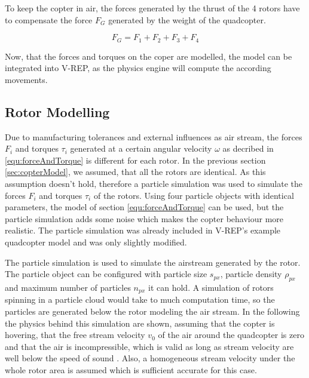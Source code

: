    To keep the copter in air, the forces generated by the thrust of the 4 rotors have to compensate the force $F_{G}$ generated by the weight of the quadcopter.
    
    \begin{equation}
    F_G = F_1 + F_2 +F_3 + F_4
    \end{equation}
    
    Now, that the forces and torques on the coper are modelled, the model can be integrated into V-REP, as the physics engine will compute the according movements.
    
    
    \subsection{Rotor Modelling}
    
    
    
    
    Due to manufacturing tolerances and external influences as air stream, the forces $F_i$ and torques $\tau_i$ generated at a certain angular velocity $\omega$ as decribed in \ref{equ:forceAndTorque} is different for each rotor. 
    In the previous section \ref{sec:copterModel}, we assumed, that all the rotors are identical. 
    As this assumption doesn't hold, therefore a particle simulation was used to simulate the forces $F_i$ and torques $\tau_i$ of the rotors. 
    Using four particle objects with identical parameters, the model of section \ref{equ:forceAndTorque} can be used, but the particle simulation adds some noise which makes the copter behaviour more realistic. 
    The particle simulation was already included in V-REP's example quadcopter model and was only slightly modified.
    
    The particle simulation is used to simulate the airstream generated by the rotor. 
    The particle object can be configured with  particle size $s_{px}$, particle density $\rho_{px}$ and maximum number of particles $n_{px}$ it can hold. 
    A simulation of rotors spinning in a particle cloud would take to much computation time, so the  particles are generated below the rotor modeling the air stream. 
    In the following the physics behind this simulation are shown, assuming that the copter is hovering, that the free stream velocity $v_0$ of the air around the quadcopter is zero and that the air is incompressible, which is valid as long as stream velocity are well below the speed of sound \cite{Lautrup2011PhysicsContinuous}.
     Also, a homogeneous stream velocity under the whole rotor area is assumed which is sufficient accurate for this case. 
    
